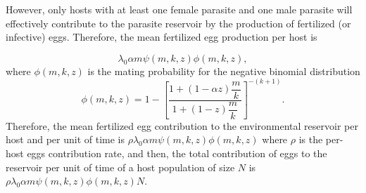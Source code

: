 \documentclass[eng]{MMSB-class-eng}
\begin{document}
However, only hosts with at least one female parasite and one male parasite will effectively contribute to the parasite reservoir by the production of fertilized (or infective) eggs. 
Therefore, the mean fertilized egg production per host is

\begin{equation}\label{meanfertilizedeggs}
\lambda_0
\alpha m
\psi(m,k,z)\phi(m,k,z),
\end{equation} 
where $\phi(m,k,z)$ is the mating probability for the negative binomial distribution \citet{lopez2022general}
\begin{equation}\label{phi}
\phi(m,k,z)=1-\left[ \frac{1+ \left( 1-
	\alpha z
	\right) \dfrac{m}{k}}{1+(1-z)\dfrac{m}{k}}\right] ^{-(k+1)}.
\end{equation}
Therefore, the mean fertilized egg contribution to the environmental reservoir  per host and per unit of time is
$\rho\lambda_0
\alpha m
\psi(m,k,z) \phi(m,k,z)$ where $\rho$ 
is the per-host eggs contribution rate, and then, the total contribution of eggs to the reservoir per unit of time of a host population of size $N$ is 
$\rho\lambda_0
\alpha m
\psi(m,k,z) \phi(m,k,z) N$. 
\end{document}
